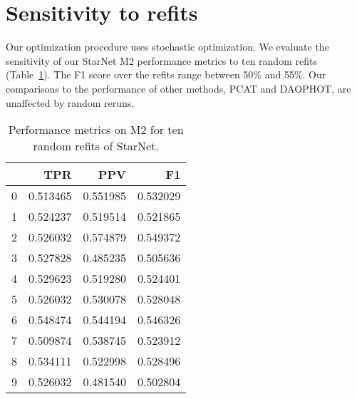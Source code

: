 \section{Sensitivity to refits}
\label{sec:refits}

Our optimization procedure uses stochastic optimization. 
We evaluate the sensitivity of our StarNet M2 performance metrics to ten random refits (Table~\ref{tab:refits}). 
The F1 score over the refits range
between 50\% and 55\%. Our comparisons 
to the performance of other methods, PCAT and DAOPHOT, 
are unaffected by random reruns. 

\begin{table}
\centering
\caption{Performance metrics on M2 for ten random refits of StarNet. }
\label{tab:refits}
\begin{tabular}{lrrr}
\toprule
 &       TPR &       PPV &        F1 \\
\midrule
0 &  0.513465 &  0.551985 &  0.532029 \\
1 &  0.524237 &  0.519514 &  0.521865 \\
2 &  0.526032 &  0.574879 &  0.549372 \\
3 &  0.527828 &  0.485235 &  0.505636 \\
4 &  0.529623 &  0.519280 &  0.524401 \\
5 &  0.526032 &  0.530078 &  0.528048 \\
6 &  0.548474 &  0.544194 &  0.546326 \\
 7 &  0.509874 &  0.538745 &  0.523912 \\
8 &  0.534111 &  0.522998 &  0.528496 \\
9 &  0.526032 &  0.481540 &  0.502804 \\
\bottomrule
\end{tabular}
\end{table}
